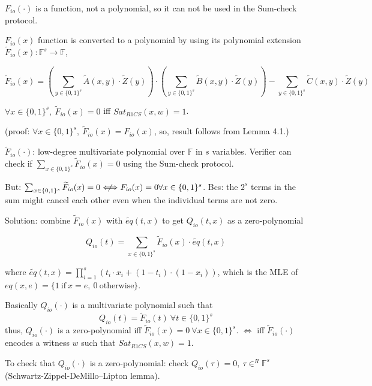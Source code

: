 \documentclass{article}
\theoremstyle{definition}
\newenvironment{lemma}[1]
{\renewcommand\theinnerlemma{#1}\innerlemma}
{\endinnerlemma}
\begin{document}
$F_{io}(\cdot)$ is a function, not a polynomial, so it can not be used in the Sum-check protocol.

$F_{io}(x)$ function is converted to a polynomial by using its polynomial extension $\widetilde{F}_{io}(x): \mathbb{F}^s \rightarrow \mathbb{F}$,
\begin{small}
$$
\widetilde{F}_{io}(x)=\left( \sum_{y \in \{0,1\}^s} \widetilde{A}(x, y) \cdot \widetilde{Z}(y) \right) \cdot \left( \sum_{y \in \{0,1\}^s} \widetilde{B}(x, y) \cdot \widetilde{Z}(y) \right) - \sum_{y \in \{0,1\}^s} \widetilde{C}(x, y) \cdot \widetilde{Z}(y)
$$
\end{small}

\begin{lemma}{4.2}
	$\forall x \in \{0,1\}^s,~ \widetilde{F}_{io}(x)=0$ iff $Sat_{R1CS}(x, w)=1$.
\end{lemma}

(proof: $\forall x \in \{0,1\}^s,~ \widetilde{F}_{io}(x)=F_{io}(x)$, so, result follows from Lemma 4.1.) %

\vspace{0.5cm}

$\widetilde{F}_{io}(\cdot)$: low-degree multivariate polynomial over $\mathbb{F}$ in $s$ variables.
Verifier can check if $\sum_{x \in \{0,1\}^s} \widetilde{F}_{io}(x)=0$ using the Sum-check protocol.

But: $\sum_{x\in \{0,1\}^s} \widetilde{F}_{io}(x)=0 \centernot\Longleftrightarrow F_{io}(x)=0 \forall x \in \{0,1\}^s$.
Bcs: the $2^s$ terms in the sum might cancel each other even when the individual terms are not zero.

Solution: combine $\widetilde{F}_{io}(x)$ with $\widetilde{eq}(t, x)$ to get $Q_{io}(t, x)$ as a zero-polynomial

$$Q_{io}(t)= \sum_{x \in \{0,1\}^s} \widetilde{F}_{io}(x) \cdot \widetilde{eq}(t, x)$$

where $\widetilde{eq}(t, x) = \prod_{i=1}^s (t_i \cdot x_i + (1- t_i) \cdot (1- x_i))$, which is the MLE of $eq(x,e)= \{ 1 ~\text{if}~ x=e,~ 0 ~\text{otherwise} \}$.

Basically $Q_{io}(\cdot)$ is a multivariate polynomial such that
$$Q_{io}(t) = \widetilde{F}_{io}(t) ~\forall t \in \{0,1\}^s$$
thus, $Q_{io}(\cdot)$ is a zero-polynomial iff $\widetilde{F}_{io}(x)=0 ~\forall x\in \{0,1\}^s$.
$\Longleftrightarrow$ iff $\widetilde{F}_{io}(\cdot)$ encodes a witness $w$ such that $Sat_{R1CS}(x, w)=1$.

To check that $Q_{io}(\cdot)$ is a zero-polynomial: check $Q_{io}(\tau)=0,~ \tau \in^R \mathbb{F}^s$ (Schwartz-Zippel-DeMillo–Lipton lemma).
\end{document}
